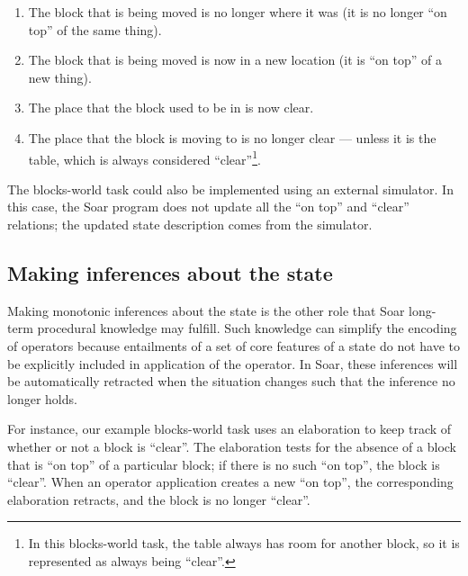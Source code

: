 \begin{enumerate}\label{LIST:blocks-app}
\item The block that is being moved is no longer where it was (it is no longer
   	``on top'' of the same thing).\vspace{-6pt}
\item The block that is being moved is now in a new location (it is ``on top''
	of a new thing).\vspace{-6pt}
\item The place that the block used to be in is now clear.\vspace{-6pt}
\item The place that the block is moving to is no longer clear --- unless it
	is the table, which is always considered ``clear''\footnote{In this
	blocks-world task, the table always has room for another block, so it
	is represented as always being ``clear''.}.
\end{enumerate}

The blocks-world task could also be implemented using an external simulator. In this case,
the Soar program does not update all the ``on top'' and ``clear'' relations;
the updated state description comes from the simulator.

\subsection{Making inferences about the state}

Making monotonic inferences about the state is the other role that Soar
long-term procedural knowledge may fulfill. Such  knowledge can simplify
the encoding of operators because entailments of a set of core features
of a state do not have to be explicitly included in application of the
operator.  In Soar, these inferences will be automatically retracted
when the situation changes such that the inference no longer holds.

For instance, our example blocks-world task uses an elaboration to keep track
of whether or not a block is ``clear''. The elaboration tests for the absence
of a block that is ``on top'' of a particular block; if there is no such ``on top'',
the block is ``clear''. When an operator application creates a new ``on top'', the
corresponding elaboration retracts, and the block is no longer ``clear''.


